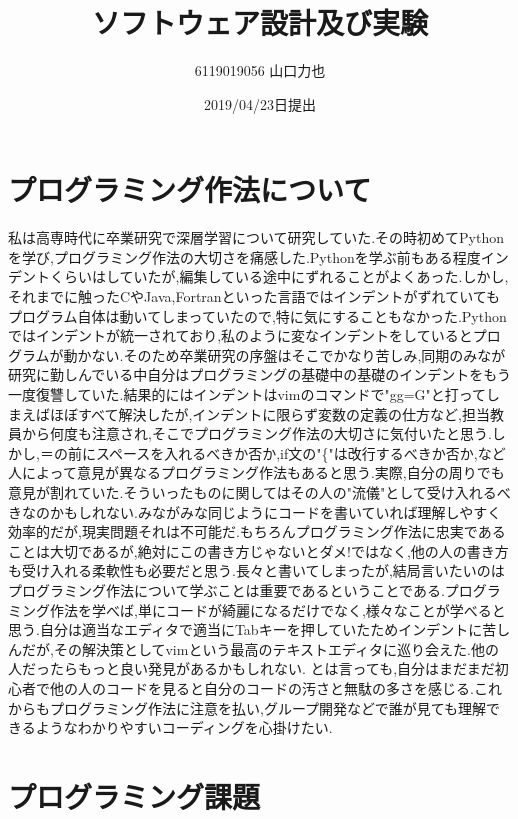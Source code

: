 \documentclass{jarticle}
\title{ソフトウェア設計及び実験\\}
\author{6119019056 山口力也}
\date{2019/04/23日提出}
\begin{document}
\maketitle
\section{プログラミング作法について}

私は高専時代に卒業研究で深層学習について研究していた.その時初めてPythonを学び,プログラミング作法の大切さを痛感した.Pythonを学ぶ前もある程度インデントくらいはしていたが,編集している途中にずれることがよくあった.しかし,それまでに触ったCやJava,Fortranといった言語ではインデントがずれていてもプログラム自体は動いてしまっていたので,特に気にすることもなかった.Pythonではインデントが統一されており,私のように変なインデントをしているとプログラムが動かない.そのため卒業研究の序盤はそこでかなり苦しみ,同期のみなが研究に勤しんでいる中自分はプログラミングの基礎中の基礎のインデントをもう一度復讐していた.結果的にはインデントはvimのコマンドで"gg=G"と打ってしまえばほぼすべて解決したが,インデントに限らず変数の定義の仕方など,担当教員から何度も注意され,そこでプログラミング作法の大切さに気付いたと思う.しかし,＝の前にスペースを入れるべきか否か,if文の"\{"は改行するべきか否か,など人によって意見が異なるプログラミング作法もあると思う.実際,自分の周りでも意見が割れていた.そういったものに関してはその人の"流儀"として受け入れるべきなのかもしれない.みながみな同じようにコードを書いていれば理解しやすく効率的だが,現実問題それは不可能だ.もちろんプログラミング作法に忠実であることは大切であるが,絶対にこの書き方じゃないとダメ!ではなく,他の人の書き方も受け入れる柔軟性も必要だと思う.長々と書いてしまったが,結局言いたいのはプログラミング作法について学ぶことは重要であるということである.プログラミング作法を学べば,単にコードが綺麗になるだけでなく,様々なことが学べると思う.自分は適当なエディタで適当にTabキーを押していたためインデントに苦しんだが,その解決策としてvimという最高のテキストエディタに巡り会えた.他の人だったらもっと良い発見があるかもしれない.
とは言っても,自分はまだまだ初心者で他の人のコードを見ると自分のコードの汚さと無駄の多さを感じる.これからもプログラミング作法に注意を払い,グループ開発などで誰が見ても理解できるようなわかりやすいコーディングを心掛けたい.

\section{プログラミング課題}
\end{document}
